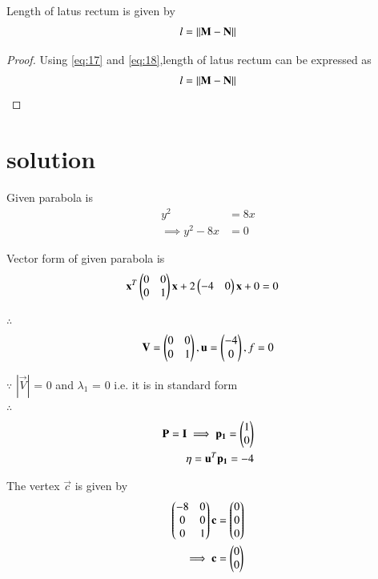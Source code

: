 \documentclass[journal,12pt,twocolumn]{IEEEtran}
\begin{document}
\begin{lemma}
Length of latus rectum is given by 
\begin{align}
    l=\left\lVert\mathbf{M}-\mathbf{N}\right\rVert
\end{align}
\end{lemma}
\begin{proof}
Using \eqref{eq:17} and \eqref{eq:18},length of latus rectum can be expressed as
\begin{align}
    l=\left\lVert\mathbf{M}-\mathbf{N}\right\rVert
\end{align}
\end{proof}

\section{solution}
Given parabola is 
\begin{align}
y^2 &= 8x
\\
\implies y^2 - 8x &= 0
\end{align}

Vector form of given parabola is
\begin{align}
\mathbf{x}^T\begin{pmatrix}0 & 0 \\ 0 & 1\end{pmatrix}\mathbf{x} + 2\begin{pmatrix}-4 & 0\end{pmatrix}\mathbf{x} + 0 &= 0 
\end{align}

$\therefore$
\begin{align}
 \mathbf{V} = \begin{pmatrix}0 & 0 \\ 0 & 1\end{pmatrix} ,
 \mathbf{u} = \begin{pmatrix}-4\\0\end{pmatrix} ,
 f = 0
\end{align}

$\because$
$|\vec{V}|$ = 0 and $\lambda_1$ = 0 i.e. it is in standard form
\\
$\therefore$
\begin{align}
\mathbf{P}=\mathbf{I} \implies \mathbf{p_1} = \begin{pmatrix}1\\0\end{pmatrix}
\\
\eta = \mathbf{u}^T\mathbf{p_1} = -4
\end{align}

The vertex $\vec{c}$ is given by
\begin{align}
\begin{pmatrix}-8 & 0\\0 & 0\\0 & 1\end{pmatrix}\mathbf{c} &= \begin{pmatrix}0\\0\\0\end{pmatrix}
\\
\implies \mathbf{c} &= \begin{pmatrix}0\\0\end{pmatrix}
\end{align}
\end{document}
